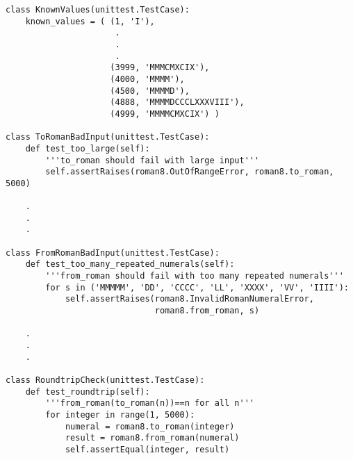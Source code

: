 \noindent\begin{minipage}{\textwidth}
\begin{lstlisting}[mathescape=True]
class KnownValues(unittest.TestCase):
    known_values = ( (1, 'I'),
                      .
                      .
                      .
                     (3999, 'MMMCMXCIX'),
                     (4000, 'MMMM'),
                     (4500, 'MMMMD'),
                     (4888, 'MMMMDCCCLXXXVIII'),
                     (4999, 'MMMMCMXCIX') )

class ToRomanBadInput(unittest.TestCase):
    def test_too_large(self):
        '''to_roman should fail with large input'''
        self.assertRaises(roman8.OutOfRangeError, roman8.to_roman, 5000)

    .
    .
    .

class FromRomanBadInput(unittest.TestCase):
    def test_too_many_repeated_numerals(self):
        '''from_roman should fail with too many repeated numerals'''
        for s in ('MMMMM', 'DD', 'CCCC', 'LL', 'XXXX', 'VV', 'IIII'):
            self.assertRaises(roman8.InvalidRomanNumeralError, 
                              roman8.from_roman, s)

    .
    .
    .

class RoundtripCheck(unittest.TestCase):
    def test_roundtrip(self):
        '''from_roman(to_roman(n))==n for all n'''
        for integer in range(1, 5000):
            numeral = roman8.to_roman(integer)
            result = roman8.from_roman(numeral)
            self.assertEqual(integer, result)
\end{lstlisting}
\end{minipage}

